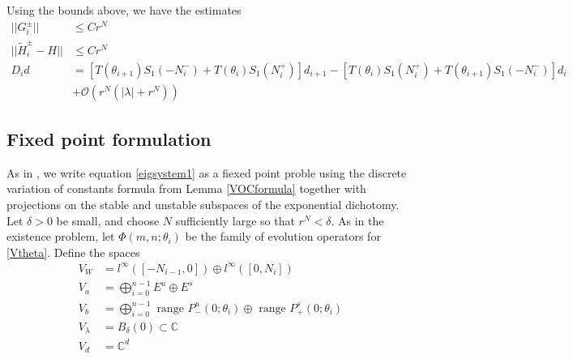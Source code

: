 \documentclass[12pt]{article}
\def\C{{\mathbb C}}
\begin{document}
Using the bounds above, we have the estimates
\begin{align*}
||G_i^\pm|| &\leq C r^N \\
||\tilde{H}_i^\pm - H|| &\leq C r^N \\
D_i d &= [ T(\theta_{i+1}) S_1(-N_i^-) + T(\theta_i) S_1(N_i^+) ] d_{i+1}
- [ T(\theta_i) S_1(N_i^+) + T(\theta_{i+1}) S_1(-N_i^-) ] d_i \\
&+\mathcal{O}(r^N( |\lambda| + r^N))
\end{align*}

\subsection{Fixed point formulation}

As in \cite{Sandstede1998}, we write equation \eqref{eigsystem1} as a fiexed point proble using the discrete variation of constants formula from Lemma \ref{VOCformula} together with projections on the stable and unstable subspaces of the exponential dichotomy. Let $\delta > 0$ be small, and choose $N$ sufficiently large so that $r^N < \delta$. As in the existence problem, let $\Phi(m, n; \theta_i)$ be the family of evolution operators for \eqref{Vtheta}. Define the spaces
\begin{align*}
V_W &= l^\infty([-N_{i-1}, 0]) \oplus l^\infty([0, N_i])  \\
V_a &= \bigoplus_{i=0}^{n-1} E^u \oplus E^s \\
V_b &= \bigoplus_{i=0}^{n-1} 
\text{ range } P_-^u(0; \theta_i) \oplus \text{ range } P_+^s(0; \theta_i)\\
V_\lambda &= B_\delta(0) \subset \C \\
V_d &= \C^d
\end{align*}
\end{document}
